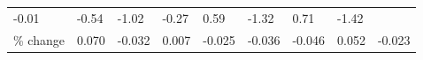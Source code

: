 \documentclass[
]{book}
\begin{document}
\begin{longtable}[]{@{}lllllllll@{}}
\begin{minipage}[t]{0.08\columnwidth}
-0.01\strut
\end{minipage} & \begin{minipage}[t]{0.09\columnwidth}\raggedright
-0.54\strut
\end{minipage} & \begin{minipage}[t]{0.07\columnwidth}\raggedright
-1.02\strut
\end{minipage} & \begin{minipage}[t]{0.06\columnwidth}\raggedright
-0.27\strut
\end{minipage} & \begin{minipage}[t]{0.11\columnwidth}\raggedright
0.59\strut
\end{minipage} & \begin{minipage}[t]{0.07\columnwidth}\raggedright
-1.32\strut
\end{minipage} & \begin{minipage}[t]{0.07\columnwidth}\raggedright
0.71\strut
\end{minipage} & \begin{minipage}[t]{0.10\columnwidth}\raggedright
-1.42\strut
\end{minipage}\tabularnewline
\begin{minipage}[t]{0.10\columnwidth}\raggedright
\% change\strut
\end{minipage} & \begin{minipage}[t]{0.08\columnwidth}\raggedright
0.070\strut
\end{minipage} & \begin{minipage}[t]{0.09\columnwidth}\raggedright
-0.032\strut
\end{minipage} & \begin{minipage}[t]{0.07\columnwidth}\raggedright
0.007\strut
\end{minipage} & \begin{minipage}[t]{0.06\columnwidth}\raggedright
-0.025\strut
\end{minipage} & \begin{minipage}[t]{0.11\columnwidth}\raggedright
-0.036\strut
\end{minipage} & \begin{minipage}[t]{0.07\columnwidth}\raggedright
-0.046\strut
\end{minipage} & \begin{minipage}[t]{0.07\columnwidth}\raggedright
0.052\strut
\end{minipage} & \begin{minipage}[t]{0.10\columnwidth}\raggedright
-0.023\strut
\end{minipage}\tabularnewline

\end{longtable}
\end{document}

